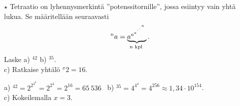 \begin{tehtavasivu}
\begin{tehtava}
$\star$ Tetraatio on lyhennysmerkintä ''potenssitornille'',
jossa esiintyy vain yhtä lukua. Se määritellään seuraavasti
\[^na = \underbrace{{a^{a^{a^{\mathstrut^{.^{.^{.^{a}}}}}}}}}_{n\textrm{ kpl }}. \]
Laske  a) $^42$   b) $^35$. \\ c) Ratkaise yhtälö $^x2= 16$.
\begin{vastaus}
a) $^42 = 2^{2^{2^2}}=2^{2^4}=2^{16}=65\ 536$ \
b) $^35 = 4^{4^4} = 4^{256} \approx 1,34 \cdot 10^{154}$. \\
c) Kokeilemalla $x =3$.
\end{vastaus}
\end{tehtava}

\end{tehtavasivu}
